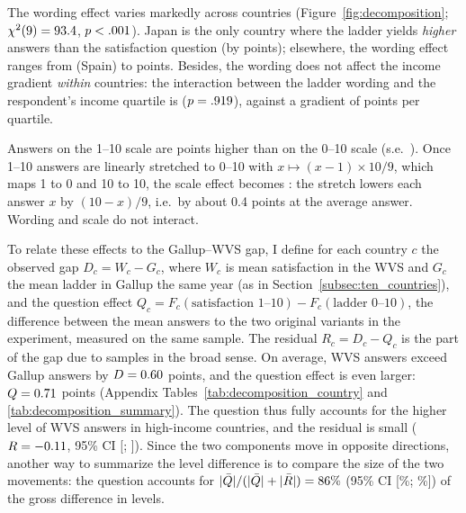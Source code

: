 \documentclass[12pt]{article}
\begin{document}
The wording effect varies markedly across countries (Figure~\ref{fig:decomposition}; $\chi^2(9) = 93.4$, $p < .001$). 
Japan is the only country where the ladder yields \textit{higher} answers than the satisfaction question (by \wordingJPN points); elsewhere, the wording effect ranges from \wordingMin (Spain) to \wordingMaxNegative points. Besides, the wording does not affect the income gradient \textit{within} countries: the interaction between the ladder wording and the respondent's income quartile is \interactionLadderIncome ($p = .919$), against a gradient of \gradientIncomeSatisfaction points per quartile.

Answers on the 1--10 scale are \effectScale points higher than on the 0--10 scale (s.e.\ \seScale). Once 1--10 answers are linearly stretched to 0--10 with $x \mapsto (x-1) \times 10/9$, which maps 1 to 0 and 10 to 10, the scale effect becomes \effectScaleZeroTen: the stretch lowers each answer $x$ by $(10-x)/9$, i.e.\ by about 0.4 points at the average answer. Wording and scale do not interact. 

To relate these effects to the Gallup--WVS gap, I define for each country $c$ the observed gap $D_c = W_c - G_c$, where $W_c$ is mean satisfaction in the WVS and $G_c$ the mean ladder in Gallup the same year (as in Section~\ref{subsec:ten_countries}), and the question effect $Q_c = F_c(\text{satisfaction 1--10}) - F_c(\text{ladder 0--10})$, the difference between the mean answers to the two original variants in the experiment, measured on the same sample. The residual $R_c = D_c - Q_c$ is the part of the gap due to samples in the broad sense. On average, WVS answers exceed Gallup answers by $D = 0.60$ points, and the question effect is even larger: $Q = 0.71$ points (Appendix Tables~\ref{tab:decomposition_country} and \ref{tab:decomposition_summary}). The question thus fully accounts for the higher level of WVS answers in high-income countries, and the residual is small ($R = -0.11$, 95\% CI [\decompLowMeanResidual; \decompHighMeanResidual]). 
Since the two components move in opposite directions, another way to summarize the level difference is to compare the size of the two movements: the question accounts for $|\bar Q|/(|\bar Q|+|\bar R|) = 86\%$ (95\% CI [\decompLowShareAbsQuestionPct\%; \decompHighShareAbsQuestionPct\%]) of the gross difference in levels.
\end{document}
